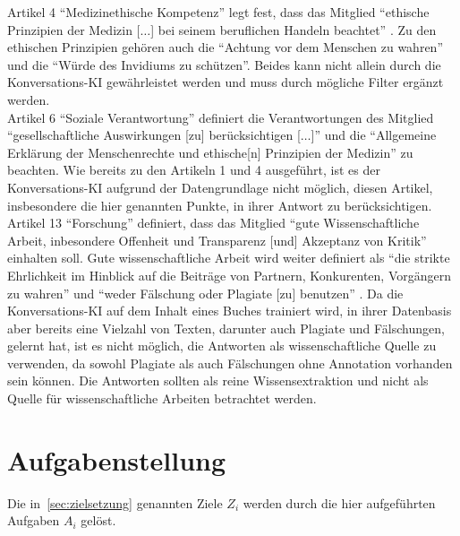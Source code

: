 Artikel 4 \enquote{Medizinethische Kompetenz} legt fest, dass das Mitglied
\enquote{ethische Prinzipien der Medizin [$\dots$] bei seinem beruflichen Handeln beachtet} \citep{gmds_eth}.
Zu den ethischen Prinzipien \citep{gmds_eth} gehören auch die \enquote{Achtung vor dem Menschen zu wahren} und die \enquote{Würde des Invidiums zu schützen}.
Beides kann nicht allein durch die Konversations-KI gewährleistet werden und muss durch mögliche Filter ergänzt werden.\\

Artikel 6 \enquote{Soziale Verantwortung} definiert die Verantwortungen des Mitglied
\enquote{gesellschaftliche Auswirkungen [zu] berücksichtigen [$\dots$]} und die
\enquote{Allgemeine Erklärung der Menschenrechte und ethische[n] Prinzipien der Medizin} \citep{gmds_eth}zu beachten.
Wie bereits zu den Artikeln 1 und 4 ausgeführt, ist es der Konversations-KI aufgrund der Datengrundlage nicht möglich, diesen Artikel, insbesondere die hier genannten Punkte, in ihrer Antwort zu berücksichtigen.\\

Artikel 13 \enquote{Forschung} definiert, dass das Mitglied \enquote{gute Wissenschaftliche Arbeit, inbesondere Offenheit und Transparenz [und] Akzeptanz von Kritik} \citep{gmds_eth} einhalten soll.
Gute wissenschaftliche Arbeit wird weiter definiert als
\enquote{die strikte Ehrlichkeit im Hinblick auf die Beiträge von Partnern, Konkurenten, Vorgängern zu wahren} und \enquote{weder Fälschung oder Plagiate [zu] benutzen} \citep{gmds_eth}.
Da die Konversations-KI auf dem Inhalt eines Buches trainiert wird, in ihrer Datenbasis aber bereits eine Vielzahl von Texten, darunter auch Plagiate und Fälschungen, gelernt hat,
ist es nicht möglich, die Antworten als wissenschaftliche Quelle zu verwenden, da sowohl Plagiate als auch Fälschungen ohne Annotation vorhanden sein können.
Die Antworten sollten als reine Wissensextraktion und nicht als Quelle für wissenschaftliche Arbeiten betrachtet werden.

\section{Aufgabenstellung}

Die in~\cref{sec:zielsetzung} genannten Ziele $Z_i$ werden durch die hier aufgeführten Aufgaben $A_i$ gelöst.

